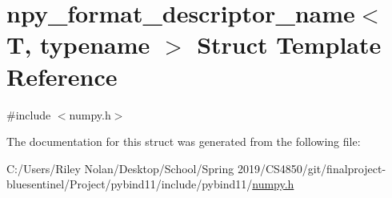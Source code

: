 \hypertarget{structnpy__format__descriptor__name}{}\section{npy\+\_\+format\+\_\+descriptor\+\_\+name$<$ T, typename $>$ Struct Template Reference}
\label{structnpy__format__descriptor__name}


{\ttfamily \#include $<$numpy.\+h$>$}



The documentation for this struct was generated from the following file\+:\begin{DoxyCompactItemize}
\item 
C\+:/\+Users/\+Riley Nolan/\+Desktop/\+School/\+Spring 2019/\+C\+S4850/git/finalproject-\/bluesentinel/\+Project/pybind11/include/pybind11/\mbox{\hyperlink{numpy_8h}{numpy.\+h}}\end{DoxyCompactItemize}
